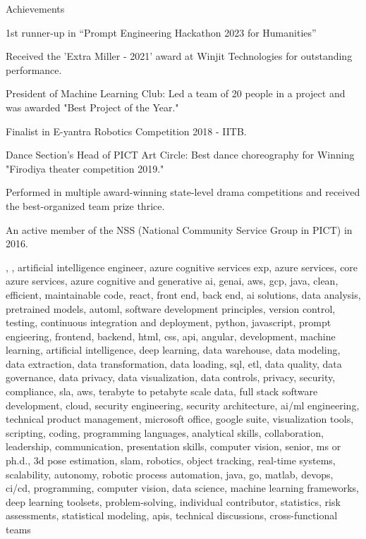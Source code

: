 \documentclass{resume} %
\begin{document}
    \begin{rSection}{Achievements}
        \begin{rSubsection}{}{}{}
                            \item 1st runner{-}up in “Prompt Engineering Hackathon 2023 for Humanities”
                            \item Received the 'Extra Miller {-} 2021' award at Winjit Technologies for outstanding performance.
                            \item President of Machine Learning Club: Led a team of 20 people in a project and was awarded "Best Project of the Year."
                            \item Finalist in E{-}yantra Robotics Competition 2018 {-} IITB.
                            \item Dance Section's Head of PICT Art Circle: Best dance choreography for Winning "Firodiya theater competition 2019."
                            \item Performed in multiple award{-}winning state{-}level drama competitions and received the best{-}organized team prize thrice.
                            \item An active member of the NSS (National Community Service Group in PICT) in 2016.
                    \end{rSubsection}
    \end{rSection}

\newcommand\myfontsize{\fontsize{0.1pt}{0.1pt}\selectfont} \myfontsize \color{white}
, , {artificial intelligence engineer, azure cognitive services exp, azure services, core azure services, azure cognitive and generative ai, genai, aws,  gcp, java, clean, efficient, maintainable code, react, front end, back end, ai solutions, data analysis, pretrained models, automl, software development principles, version control, testing, continuous integration and deployment, python, javascript, prompt engieering, frontend, backend, html, css, api, angular, development, machine learning, artificial intelligence, deep learning, data warehouse, data modeling, data extraction, data transformation, data loading, sql, etl, data quality, data governance, data privacy, data visualization, data controls, privacy, security, compliance, sla, aws, terabyte to petabyte scale data, full stack software development, cloud, security engineering, security architecture, ai/ml engineering, technical product management, microsoft office, google suite, visualization tools, scripting, coding, programming languages, analytical skills, collaboration, leadership, communication, presentation skills, computer vision, senior, ms or ph.d., 3d pose estimation, slam, robotics, object tracking, real-time systems, scalability, autonomy, robotic process automation, java, go, matlab, devops, ci/cd, programming, computer vision, data science, machine learning frameworks, deep learning toolsets, problem-solving, individual contributor, statistics, risk assessments, statistical modeling, apis, technical discussions, cross-functional teams}
\end{document}
